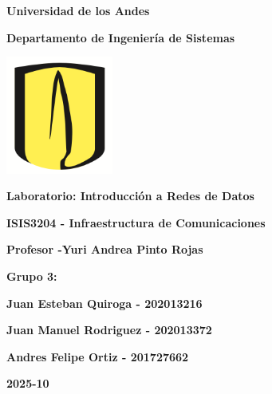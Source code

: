 \documentclass[10pt]{article}
\title{ }
\begin{document}
\begingroup
\let\clearpage\relax %
\thispagestyle{empty}
\begin{center}
{\huge \bfseries Universidad de los Andes}

\vspace{25pt}
{\LARGE \bfseries Departamento de Ingeniería de Sistemas}

\vspace{15pt}
\includegraphics[width=100pt]{images/logo.png} 


\vspace{35pt}
{\LARGE \bfseries Laboratorio: Introducción a Redes de Datos}
\vspace{55pt}

{\Large \bfseries ISIS3204 - Infraestructura de Comunicaciones}

\vspace{15pt}
{\Large \bfseries Profesor -Yuri Andrea Pinto Rojas}


\vspace{100pt}
{\Large \bfseries Grupo 3: }

\end{center}

\begin{flushleft}
  \setlength{\parskip}{0pt}
  \setlength{\itemsep}{0pt}
  \hspace*{4cm}\large\bfseries Juan Esteban Quiroga - 202013216

  \hspace*{4cm}\large\bfseries Juan Manuel Rodriguez - 202013372

  \hspace*{4cm}\large\bfseries Andres Felipe Ortiz - 201727662
\end{flushleft}

\begin{center}
\vspace{60pt}

\Large\bfseries 2025-10
\end{center}


\mbox{}
\endgroup

\clearpage

\tableofcontents
\clearpage
\end{document}
